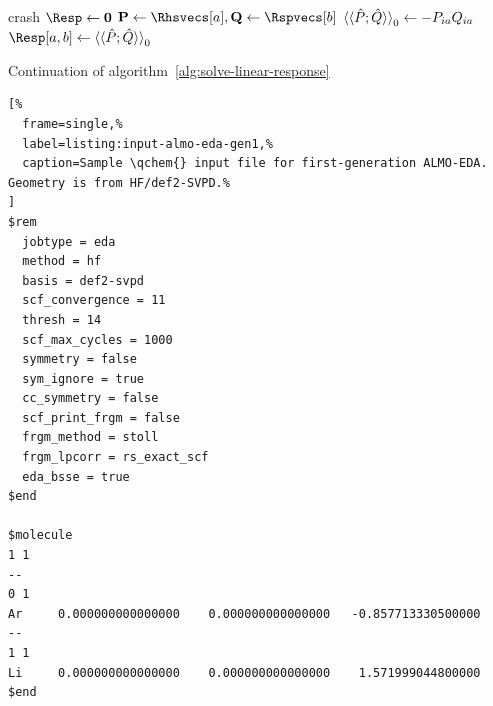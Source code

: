 \begin{algorithm}
  \centering
  \begin{algorithmic}[1]
        \EndFor
        \State crash
      \EndIf
    \EndFor
  \EndFor
  \State \(\Resp \gets \mat{0}\)
      \State \(\mat{P} \gets \Rhsvecs[a], \mat{Q} \gets \Rspvecs[b]\)
      \State \(\braket{\braket{\hat{P}; \hat{Q}}}_{0} \gets -P_{ia}Q_{ia}\)
      \State \(\Resp[a,b] \gets \lr{P}{Q}_{0}\)
    \EndFor
  \EndFor
  \EndProcedure
  \end{algorithmic}
  \caption{Continuation of algorithm~\ref{alg:solve-linear-response}}
  \label{alg:solve-linear-response-2}
\end{algorithm}

\begin{lstlisting}[%
  frame=single,%
  label=listing:input-almo-eda-gen1,%
  caption=Sample \qchem{} input file for first-generation ALMO-EDA. Geometry is from HF/def2-SVPD.%
]
$rem
  jobtype = eda
  method = hf
  basis = def2-svpd
  scf_convergence = 11
  thresh = 14
  scf_max_cycles = 1000
  symmetry = false
  sym_ignore = true
  cc_symmetry = false
  scf_print_frgm = false
  frgm_method = stoll
  frgm_lpcorr = rs_exact_scf
  eda_bsse = true
$end

$molecule
1 1
--
0 1
Ar     0.000000000000000    0.000000000000000   -0.857713330500000
--
1 1
Li     0.000000000000000    0.000000000000000    1.571999044800000
$end
\end{lstlisting}
